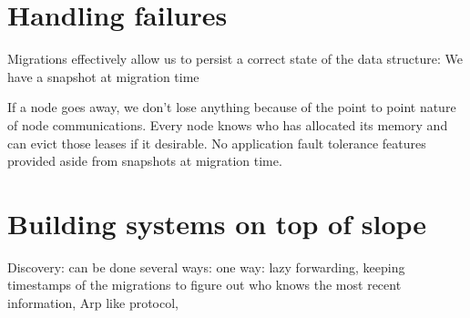 \section{Handling failures}
Migrations effectively allow us to persist a correct state of the data structure: We have a snapshot at migration time

If a node goes away, we don't lose anything because of the point to point
nature of node communications. Every node knows who has allocated its memory
and can evict those leases if it desirable. No application fault tolerance
features provided aside from snapshots at migration time.


\section{Building systems on top of slope}
Discovery: can be done several ways: one way: lazy forwarding, keeping timestamps
of the migrations to figure out who knows the most recent information, 
Arp like protocol, 
